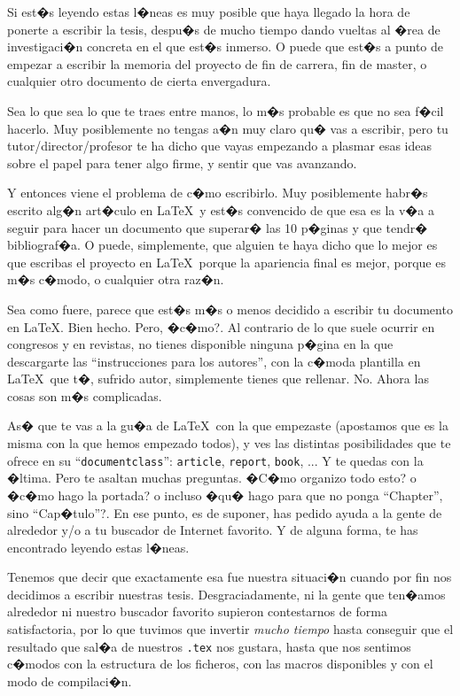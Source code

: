 Si est�s leyendo estas l�neas es muy posible que haya llegado la hora
de ponerte a escribir la tesis, despu�s de mucho tiempo dando vueltas
al �rea de investigaci�n concreta en el que est�s inmerso. O puede que
est�s a punto de empezar a escribir la memoria del proyecto de fin de
carrera, fin de master, o cualquier otro documento de cierta
envergadura.

Sea lo que sea lo que te traes entre manos, lo m�s probable es que no
sea f�cil hacerlo. Muy posiblemente no tengas a�n muy claro qu� vas a
escribir, pero tu tutor/director/profesor te ha dicho que vayas
empezando a plasmar esas ideas sobre el papel para tener algo firme, y
sentir que vas avanzando.

Y entonces viene el problema de c�mo escribirlo. Muy posiblemente
habr�s escrito alg�n art�culo en \LaTeX\ y est�s convencido de que esa
es la v�a a seguir para hacer un documento que superar� las 10 p�ginas
y que tendr� bibliograf�a. O puede, simplemente, que alguien te haya
dicho que lo mejor es que escribas el proyecto en \LaTeX\ porque la
apariencia final es mejor, porque es m�s c�modo, o cualquier otra
raz�n.

Sea como fuere, parece que est�s m�s o menos decidido a escribir tu
documento en \LaTeX. Bien hecho. Pero, �c�mo?. Al contrario de lo que
suele ocurrir en congresos y en revistas, no tienes disponible ninguna
p�gina en la que descargarte las ``instrucciones para los autores'',
con la c�moda plantilla en \LaTeX\ que t�, sufrido autor, simplemente
tienes que rellenar. No. Ahora las cosas son m�s complicadas.

As� que te vas a la gu�a de \LaTeX\ con la que empezaste (apostamos
que es la misma con la que hemos empezado todos), y ves las distintas
posibilidades que te ofrece en su ``\texttt{documentclass}'':
\texttt{article}, \texttt{report}, \texttt{book}, ... Y te quedas con
la �ltima. Pero te asaltan muchas preguntas. �C�mo organizo todo esto?
o �c�mo hago la portada? o incluso �qu� hago para que no ponga
``Chapter'', sino ``Cap�tulo''?. En ese punto, es de suponer, has
pedido ayuda a la gente de alrededor y/o a tu buscador de Internet
favorito. Y de alguna forma, te has encontrado leyendo estas l�neas.

Tenemos que decir que exactamente esa fue nuestra situaci�n cuando por
fin nos decidimos a escribir nuestras tesis. Desgraciadamente, ni la
gente que ten�amos alrededor ni nuestro buscador favorito supieron
contestarnos de forma satisfactoria, por lo que tuvimos que invertir
\emph{mucho tiempo} hasta conseguir que el resultado que sal�a de
nuestros \texttt{.tex} nos gustara, hasta que nos sentimos c�modos con
la estructura de los ficheros, con las macros disponibles y con el
modo de compilaci�n.

